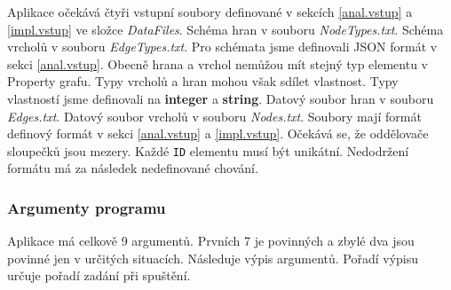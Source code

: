 Aplikace očekává čtyři vstupní soubory definované v sekcích \ref{anal.vstup} a \ref{impl.vstup} ve složce \textit{DataFiles}.
Schéma hran v souboru \textit{NodeTypes.txt}.
Schéma vrcholů v souboru \textit{EdgeTypes.txt}.
Pro schémata jsme definovali JSON formát v sekci \ref{anal.vstup}.
Obecně hrana a vrchol nemůžou mít stejný typ elementu v Property grafu.
Typy vrcholů a hran mohou však sdílet vlastnost.
Typy vlastností jsme definovali na \textbf{integer} a \textbf{string}. 
Datový soubor hran v souboru \textit{Edges.txt}.
Datový soubor vrcholů v souboru \textit{Nodes.txt}.
Soubory mají formát definový formát v sekci \ref{anal.vstup} a \ref{impl.vstup}.
Očekává se, že oddělovače sloupečků jsou mezery.
Každé \texttt{ID} elementu musí být unikátní.
Nedodržení formátu má za následek nedefinované chování.

\subsubsection{Argumenty programu} \label{impl.arguments}

Aplikace má celkově 9 argumentů.
Prvních 7 je povinných a zbylé dva jsou povinné jen v určitých situacích.
Následuje výpis argumentů.
Pořadí výpisu určuje pořadí zadání při spuštění.

